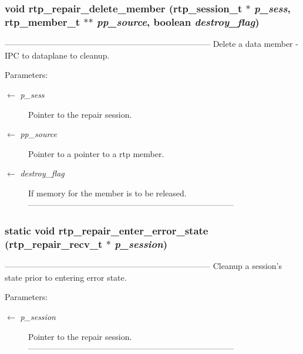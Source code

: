 \subsubsection{\setlength{\rightskip}{0pt plus 5cm}void rtp\_\-repair\_\-delete\_\-member (rtp\_\-session\_\-t $\ast$ {\em p\_\-sess}, rtp\_\-member\_\-t $\ast$$\ast$ {\em pp\_\-source}, boolean {\em destroy\_\-flag})}\label{rtp__repair__recv_8c_c8ab0a418dfab4fa239176f0b04635ad}


--------------------------------------------------------------------------- Delete a data member - IPC to dataplane to cleanup.

\begin{Desc}
\item[Parameters:]
\begin{description}
\item[\mbox{$\leftarrow$} {\em p\_\-sess}]Pointer to the repair session. \item[\mbox{$\leftarrow$} {\em pp\_\-source}]Pointer to a pointer to a rtp member. \item[\mbox{$\leftarrow$} {\em destroy\_\-flag}]If memory for the member is to be released. --------------------------------------------------------------------------- \end{description}
\end{Desc}
\subsubsection{\setlength{\rightskip}{0pt plus 5cm}static void rtp\_\-repair\_\-enter\_\-error\_\-state (\bf{rtp\_\-repair\_\-recv\_\-t} $\ast$ {\em p\_\-session})\hspace{0.3cm}{\tt  [static]}}\label{rtp__repair__recv_8c_44e9bec421840142406f102dbd5817ed}


--------------------------------------------------------------------------- Cleanup a session's state prior to entering error state.

\begin{Desc}
\item[Parameters:]
\begin{description}
\item[\mbox{$\leftarrow$} {\em p\_\-session}]Pointer to the repair session. --------------------------------------------------------------------------- \end{description}
\end{Desc}
